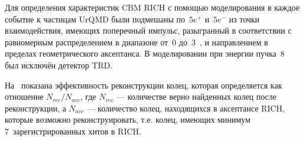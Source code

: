 Для определения характеристик CBM RICH с помощью моделирования в каждое событие к частицам UrQMD были подмешаны по~$5e^{+}$ и~$5e^{-}$ из точки взаимодействия, имеющих поперечный импульс, разыгранный в соответствии с равномерным распределением в диапазоне от~0 до~3~\GeVoverC{}, и направлением в пределах геометрического аксептанса. В моделировании при энергии пучка~8~\GeVperNucl{} был исключён детектор TRD.



На~ показана эффективность реконструкции колец, которая определяется как отношение $N_{rec} / N_{acc}$, где $N_{rec}$ --- количестве верно найденных колец после реконструкции, а $N_{acc}$ --- количество колец, находящихся в аксептансе RICH, которые возможно реконструировать, т.е. колец, имеющих минимум 7~зарегистрированных хитов в RICH.




